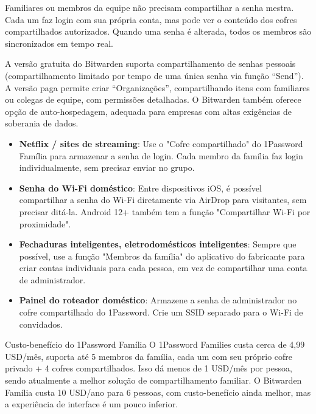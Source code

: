 Familiares ou membros da equipe não precisam compartilhar a senha mestra. Cada um faz login com sua própria conta, mas pode ver o conteúdo dos cofres compartilhados autorizados. Quando uma senha é alterada, todos os membros são sincronizados em tempo real.


A versão gratuita do Bitwarden suporta compartilhamento de senhas pessoais (compartilhamento limitado por tempo de uma única senha via função “Send”). A versão paga permite criar “Organizações”, compartilhando itens com familiares ou colegas de equipe, com permissões detalhadas. O Bitwarden também oferece opção de auto-hospedagem, adequada para empresas com altas exigências de soberania de dados.


\begin{itemize}
  \item \textbf{Netflix / sites de streaming}: Use o "Cofre compartilhado" do 1Password Família para armazenar a senha de login. Cada membro da família faz login individualmente, sem precisar enviar no grupo.
  \item \textbf{Senha do Wi-Fi doméstico}: Entre dispositivos iOS, é possível compartilhar a senha do Wi-Fi diretamente via AirDrop para visitantes, sem precisar ditá-la. Android 12+ também tem a função "Compartilhar Wi-Fi por proximidade".
  \item \textbf{Fechaduras inteligentes, eletrodomésticos inteligentes}: Sempre que possível, use a função "Membros da família" do aplicativo do fabricante para criar contas individuais para cada pessoa, em vez de compartilhar uma conta de administrador.
  \item \textbf{Painel do roteador doméstico}: Armazene a senha de administrador no cofre compartilhado do 1Password. Crie um SSID separado para o Wi-Fi de convidados.
\end{itemize}

\begin{tcbinfo}{Custo-benefício do 1Password Família}
O 1Password Families custa cerca de 4,99 USD/mês, suporta até 5 membros da família, cada um com seu próprio cofre privado + 4 cofres compartilhados. Isso dá menos de 1 USD/mês por pessoa, sendo atualmente a melhor solução de compartilhamento familiar. O Bitwarden Família custa 10 USD/ano para 6 pessoas, com custo-benefício ainda melhor, mas a experiência de interface é um pouco inferior.

\end{tcbinfo}

